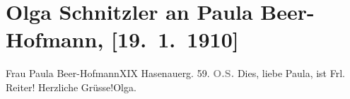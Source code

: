 

         
         \renewcommand{\erwaehntePersonen}{Personen: Paula Beer-Hofmann, Anna Reiter}
         \renewcommand{\erwaehnteOrte}{Orte: Hasenauerstraße, Wien}
         \renewcommand{\erwaehnteWerke}{}
               \section[Olga Schnitzler an Paula Beer-Hofmann, {[}19. 1. 1910{]}]{ Olga Schnitzler an Paula Beer-Hofmann, {[}19. 1. 1910{]}}\nopagebreak{}\rehead{ }\begin{ledgroupsized}[t]{13cm}\normalsize\beginnumbering \toendnotes[C]{\smallbreak\pagebreak[2]} 
\pstart{}{\pb}Frau Paula Beer-Hofmann\pend{}\pstart{}XIX Hasenauerg. 59.\pend{}{\bigskip}\pstart
           \noindent{}{\pb}\textcolor{gray}{\textbf{O.S.}}\pend
           \pstart
           Dies, liebe Paula, ist Frl. Reiter!\pend
           \pstart Herzliche Grüsse!\spacefill\mbox{Olga.}\pend{}
         
         \endnumbering{}\end{ledgroupsized}  \newcommand{\dateiname}{L02561}\newcommand{\titel}{Olga Schnitzler an Paula Beer-Hofmann, [19. 1. 1910]}\newcommand{\editorInnen}{Martin Anton Müller und Gerd-Hermann Susen}
      